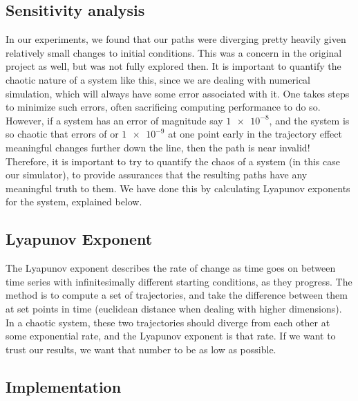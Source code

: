 \subsection{Sensitivity analysis}

In our experiments, we found that our paths were diverging pretty heavily given relatively small changes to initial conditions. This was a concern in the original project as well, but was not fully explored then. It is important to quantify the chaotic nature of a system like this, since we are dealing with numerical simulation, which will always have some error associated with it. One takes steps to minimize such errors, often sacrificing computing performance to do so. However, if a system has an error of magnitude say \(\num{1e-8}\), and the system is so chaotic that errors of or \(\num{1e-9}\) at one point early in the trajectory effect meaningful changes further down the line, then the path is near invalid! Therefore, it is important to try to quantify the chaos of a system (in this case our simulator), to provide assurances that the resulting paths have any meaningful truth to them. We have done this by calculating Lyapunov exponents for the system, explained below.

\subsection{Lyapunov Exponent}

The Lyapunov exponent describes the rate of change as time goes on between time series with infinitesimally different starting conditions, as they progress. The method is to compute a set of trajectories, and take the difference between them at set points in time (euclidean distance when dealing with higher dimensions). In a chaotic system, these two trajectories should diverge from each other at some exponential rate, and the Lyapunov exponent is that rate. If we want to trust our results, we want that number to be as low as possible. 

\subsection{Implementation}

